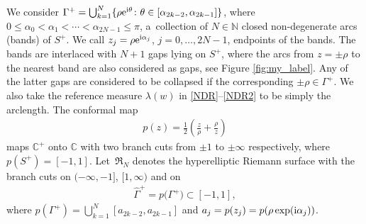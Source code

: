 \documentclass[10pt,a4paper]{amsart}
\numberwithin{equation}{section}
\newcommand{\G}{\Gamma}
\def\C{{\mathbb C}}
\def\N{{\mathbb N}}
\def\a{\alpha}
\def\l{\lambda}
\def\hf{\frac{1}{2}}
\def\l{\lambda}
\def\G{\Gamma}
\begin{document}
We consider $\G^+=\bigcup_{k=1}^N\{\rho {\rm e}^{{\rm i}\theta}\colon \theta\in [\alpha_{2k-2},\alpha_{2k-1}]\}$, where $0\leq \a_0 < \a_1<\cdots<\a_{2N-1}{\leq \pi}$,
a~collection
of $N\in \N$ closed non-degenerate arcs (bands) of $S^+$.
We call $z_j=\rho {\rm e}^{{\rm i}\a_j}$, $j=0,\dots,2N-1$, endpoints of the bands. %
The bands are interlaced with $N+1$ gaps lying on $S^+$, where the arcs from $z=\pm\rho$ to the nearest band are also considered as gaps, see Figure \ref{fig:my_label}. Any of the latter gaps are considered to be collapsed if the corresponding $\pm\rho\in\G^+$. We also take the reference measure $\l(w)$ in \eqref{NDR}--\eqref{NDR2} to be simply the arclength. The conformal map
\begin{gather}\label{conf-map-p}
p(z)=\hf\left(\frac z\rho+\frac \rho z\right)
\end{gather}
maps $\C^+$ onto $\C$ with two branch cuts from $\pm 1$ to $\pm\infty $ respectively,
where $p(S^+)=[-1,1]$. Let~$\mathfrak R_N$ denotes the hyperelliptic Riemann surface with the branch cuts on $(-\infty,-1]$, $[1,\infty)$ and on
\begin{gather*}
\hat \G^+=p\bigl(\G^+\bigr)\subset [-1,1],
\end{gather*}
where
$p(\G^+)=\bigcup_{k=1}^N[a_{2k-2},a_{2k-1}]$ and $a_j=p(z_j)=p(\rho\exp({\rm i}\a_j))$.
\end{document}
